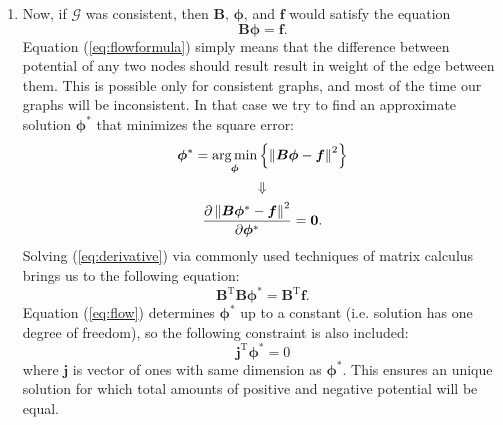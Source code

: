 \documentclass[letterpaper, 10 pt, conference]{ieeeconf}
\newcommand{\matr}[1]{\mathbold{#1}}
\newcommand{\graph}[1]{\mathcal{#1}}
\newcommand{\T}{\mathrm{T}}
\DeclareMathOperator*{\argmin}{arg\min}
\begin{document}
\begin{enumerate}
    \item Now, if $\graph{G}$ was consistent, then $\matr{B}$, $\matr{\phi}$, and $\matr{f}$ would satisfy the equation
    \begin{equation}
    \label{eq:flowformula}
    \matr{B} \matr{\phi} = \matr{f}.
    \end{equation}
    Equation (\ref{eq:flowformula}) simply means that the difference between potential of any two nodes should result result in weight of the edge between them.
    This is possible only for consistent graphs, and most of the time our graphs will be inconsistent.
    In that case we try to find an approximate solution $\matr{\phi^*}$ that minimizes the square error:
    \begin{gather}
    \matr{\phi^*} = \argmin_{\matr{\phi}} \left\{ \left \lVert \matr{B} \matr{\phi} - \matr{f}\textsl{} \right \rVert ^ 2 \right\} \nonumber \\ 
    \Downarrow \nonumber \\
    \label{eq:derivative}
    \frac{\partial \left \lVert \matr{B} \matr{\phi^*} - \matr{f} \right \rVert ^ 2}{\partial \matr{\phi^*}} = \mathbf{0}.
    \end{gather}
    Solving (\ref{eq:derivative}) via commonly used techniques of matrix calculus brings us to the following equation:
    \begin{equation}
    \label{eq:flow}
    \matr{B}^\T \matr{B} \matr{\phi^*} = \matr{B}^\T \matr{f}.
    \end{equation}
    Equation (\ref{eq:flow}) determines $\matr{\phi^*}$ up to a constant (i.e. solution has one degree of freedom), so the following constraint is also included:
    \begin{equation}
    \label{eq:sumiszero}
    \matr{j}^\T \matr{\phi^*} = 0
    \end{equation}
    where $\matr{j}$ is vector of ones with same dimension as $\matr{\phi^*}$.
    This ensures an unique solution for which total amounts of positive and negative potential will be equal.
    

\end{enumerate}
\end{document}
